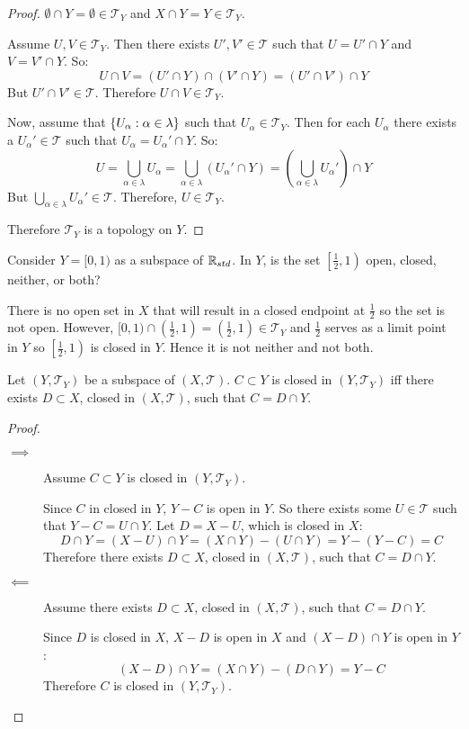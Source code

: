 \documentclass[letterpaper,12pt,fleqn]{article}
\newcommand{\T}{\mathscr{T}}
\renewcommand{\a}{\alpha}
\renewcommand{\l}{\lambda}
\begin{document}
\begin{proof}
  \(\emptyset\cap Y=\emptyset\in\T_Y\) and \(X\cap Y=Y\in\T_Y\).

  Assume \(U,V\in\T_Y\).  Then there exists \(U',V'\in\T\) such that \(U=U'\cap Y\) and \(V=V'\cap Y\).  So:
  \[U\cap V=(U'\cap Y)\cap(V'\cap Y)=(U'\cap V')\cap Y\]
  But \(U'\cap V'\in\T\).  Therefore \(U\cap V\in\T_Y\).

  Now, assume that \(\set{U_{\a}:\a\in\l}\) such that \(U_{\a}\in\T_Y\).  Then for each \(U_{\a}\) there exists a
  \(U_{\a}'\in\T\) such that \(U_{\a}=U_{\a}'\cap Y\).  So:
  \[U=\bigcup_{\a\in\l}U_{\a}=\bigcup_{\a\in\l}(U_{\a}'\cap Y)=\left(\bigcup_{\a\in\l}U_{\a}'\right)\cap Y\]
  But \(\bigcup_{\a\in\l}U_{\a}'\in\T\).  Therefore, \(U\in\T_Y\).

  Therefore \(\T_Y\) is a topology on \(Y\).
\end{proof}

\begin{example}[Exercise 3.26]
  Consider \(Y=[0,1)\) as a subspace of \(\mathbb{R}_{std}\).  In \(Y\), is the set \(\left[\frac{1}{2},1\right)\) open,
  closed, neither, or both?

  There is no open set in \(X\) that will result in a closed endpoint at \(\frac{1}{2}\) so the set is not open.
  However, \([0,1)\cap\left(\frac{1}{2},1\right)=\left(\frac{1}{2},1\right)\in\T_Y\) and \(\frac{1}{2}\) serves as
  a limit point in \(Y\) so \(\left[\frac{1}{2},1\right)\) is closed in \(Y\).  Hence it is not neither and not
  both.
\end{example}

\begin{theorem}[3.28]
  Let \((Y,\T_Y)\) be a subspace of \((X,\T)\).  \(C\subset Y\) is closed in \((Y,\T_Y)\) iff there exists
  \(D\subset X\), closed in \((X,\T)\), such that \(C=D\cap Y\).
\end{theorem}

\begin{proof}
  \begin{description}
  \item[]
  \item[\(\implies\)] Assume \(C\subset Y\) is closed in \((Y,\T_Y)\).

    Since \(C\) in closed in \(Y\), \(Y-C\) is open in \(Y\).  So there exists some \(U\in\T\) such that
    \(Y-C=U\cap Y\).  Let \(D=X-U\), which is closed in \(X\):
    \[D\cap Y=(X-U)\cap Y=(X\cap Y)-(U\cap Y)=Y-(Y-C)=C\]
    Therefore there exists \(D\subset X\), closed in \((X,\T)\), such that \(C=D\cap Y\).

  \item[\(\impliedby\)] Assume there exists \(D\subset X\), closed in \((X,\T)\), such that \(C=D\cap Y\).

    Since \(D\) is closed in \(X\), \(X-D\) is open in \(X\) and \((X-D)\cap Y\) is open in \(Y\):
    \[(X-D)\cap Y=(X\cap Y)-(D\cap Y)=Y-C\]
    Therefore \(C\) is closed in \((Y,\T_Y)\).
  \end{description}
\end{proof}
\end{document}
